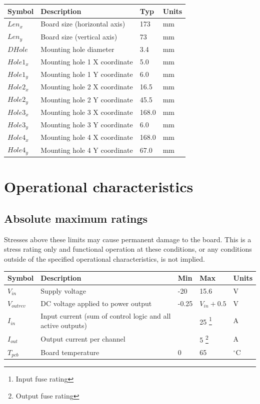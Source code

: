 \documentclass{article}
\begin{document}
\begin{longtable}{|l|p{2in}|p{0.5in}|p{0.5in}|}
\hline
{\bf Symbol} & {\bf Description} & {\bf Typ} & {\bf Units}\\
\hline
$Len_{x}$ & Board size (horizontal axis) & 173 & mm\\
\hline
$Len_{y}$ & Board size (vertical axis) & 73 & mm\\
\hline
$DHole$ & Mounting hole diameter & 3.4 & mm\\
\hline
$Hole1_{x}$ & Mounting hole 1 X coordinate & 5.0 & mm\\
$Hole1_{y}$ & Mounting hole 1 Y coordinate & 6.0 & mm\\
\hline
$Hole2_{x}$ & Mounting hole 2 X coordinate & 16.5 & mm\\
$Hole2_{y}$ & Mounting hole 2 Y coordinate & 45.5 & mm\\
\hline
$Hole3_{x}$ & Mounting hole 3 X coordinate & 168.0 & mm\\
$Hole3_{y}$ & Mounting hole 3 Y coordinate & 6.0 & mm\\
\hline
$Hole4_{x}$ & Mounting hole 4 X coordinate & 168.0 & mm\\
$Hole4_{y}$ & Mounting hole 4 Y coordinate & 67.0 & mm\\
\hline
\end{longtable}

\pagebreak
\section{Operational characteristics}
\label{sec:dcchar}

\subsection{Absolute maximum ratings}

Stresses above these limits may cause permanent damage to the board. This is a stress rating only and functional
operation at these conditions, or any conditions outside of the specified operational characteristics, is not implied.

\begin{longtable}{|l|p{2in}|p{0.5in}|p{0.65in}|p{0.5in}|}
\hline
{\bf Symbol} & {\bf Description} & {\bf Min} & {\bf Max} & {\bf Units}\\
\hline
$V_{in}$ & Supply voltage & -20 & 15.6 & V\\
\hline
$V_{outrev}$ & DC voltage applied to power output & -0.25 & $V_{in} + 0.5$ & V\\
\hline
$I_{in}$ & Input current (sum of control logic and all active outputs) & & 25 \footnote{Input fuse rating} & A\\
\hline
$I_{out}$ & Output current per channel & & 5 \footnote{Output fuse rating} & A\\
\hline
$T_{pcb}$ & Board temperature & 0 & 65 & $^{\circ}$C\\
\hline
\end{longtable}
\end{document}
